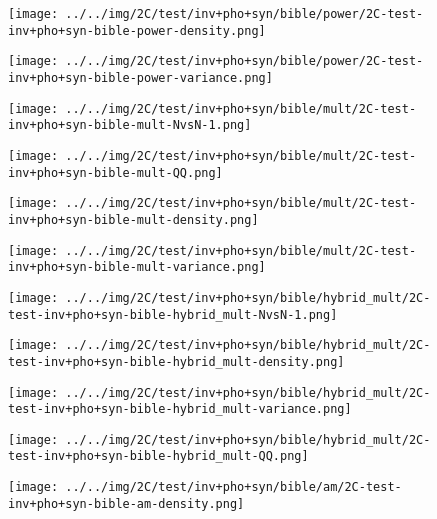 \begin{figure}[H]
\centering	\texttt{[image: ../../img/2C/test/inv+pho+syn/bible/power/2C-test-inv+pho+syn-bible-power-density.png]}
\end{figure}
\begin{figure}[H]
\centering	\texttt{[image: ../../img/2C/test/inv+pho+syn/bible/power/2C-test-inv+pho+syn-bible-power-variance.png]}
\end{figure}
\begin{figure}[H]
\centering	\texttt{[image: ../../img/2C/test/inv+pho+syn/bible/mult/2C-test-inv+pho+syn-bible-mult-NvsN-1.png]}
\end{figure}
\begin{figure}[H]
\centering	\texttt{[image: ../../img/2C/test/inv+pho+syn/bible/mult/2C-test-inv+pho+syn-bible-mult-QQ.png]}
\end{figure}
\begin{figure}[H]
\centering	\texttt{[image: ../../img/2C/test/inv+pho+syn/bible/mult/2C-test-inv+pho+syn-bible-mult-density.png]}
\end{figure}
\begin{figure}[H]
\centering	\texttt{[image: ../../img/2C/test/inv+pho+syn/bible/mult/2C-test-inv+pho+syn-bible-mult-variance.png]}
\end{figure}
\begin{figure}[H]
\centering	\texttt{[image: ../../img/2C/test/inv+pho+syn/bible/hybrid\_mult/2C-test-inv+pho+syn-bible-hybrid\_mult-NvsN-1.png]}
\end{figure}
\begin{figure}[H]
\centering	\texttt{[image: ../../img/2C/test/inv+pho+syn/bible/hybrid\_mult/2C-test-inv+pho+syn-bible-hybrid\_mult-density.png]}
\end{figure}
\begin{figure}[H]
\centering	\texttt{[image: ../../img/2C/test/inv+pho+syn/bible/hybrid\_mult/2C-test-inv+pho+syn-bible-hybrid\_mult-variance.png]}
\end{figure}
\begin{figure}[H]
\centering	\texttt{[image: ../../img/2C/test/inv+pho+syn/bible/hybrid\_mult/2C-test-inv+pho+syn-bible-hybrid\_mult-QQ.png]}
\end{figure}
\begin{figure}[H]
\centering	\texttt{[image: ../../img/2C/test/inv+pho+syn/bible/am/2C-test-inv+pho+syn-bible-am-density.png]}
\end{figure}
